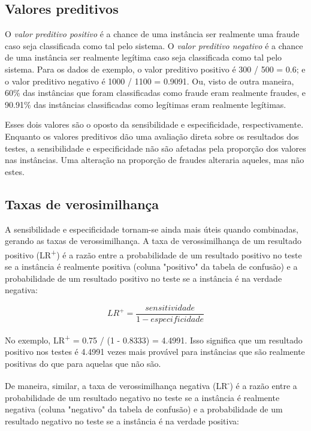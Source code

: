 \subsection{Valores preditivos}

O \emph{valor preditivo positivo} é a chance de uma instância ser realmente uma fraude caso seja classificada como tal pelo sistema. O \emph{valor preditivo negativo} é a chance de uma instância ser realmente legítima caso seja classificada como tal pelo sistema. Para os dados de exemplo, o valor preditivo positivo é 300 / 500 = 0.6; e o valor preditivo negativo é 1000 / 1100 = 0.9091. Ou, visto de outra maneira, 60\% das instâncias que foram classificadas como fraude eram realmente fraudes, e 90.91\% das instâncias classificadas como legítimas eram realmente legítimas.

Esses dois valores são o oposto da sensibilidade e especificidade, respectivamente. Enquanto os valores preditivos dão uma avaliação direta sobre os resultados dos testes, a sensibilidade e especificidade não são afetadas pela proporção dos valores nas instâncias. Uma alteração na proporção de fraudes alteraria aqueles, mas não estes.

\subsection{Taxas de verosimilhança}

A sensibilidade e especificidade tornam-se ainda mais úteis quando combinadas, gerando as taxas de verossimilhança. A taxa de verossimilhança de um resultado positivo (LR\textsuperscript{+}) é a razão entre a probabilidade de um resultado positivo no teste se a instância é realmente positiva (coluna "positivo" da tabela de confusão) e a probabilidade de um resultado positivo no teste se a instância é na verdade negativa:

\vspace{2mm}
\begin{equation}
    LR^{+}=\frac{sensitividade}{1 - especificidade}
\end{equation}
\vspace{2mm}

No exemplo, LR\textsuperscript{+} = 0.75 / (1 - 0.8333) = 4.4991. Isso significa que um resultado positivo nos testes é 4.4991 vezes mais provável para instâncias que são realmente positivas do que para aquelas que não são.

De maneira, similar, a taxa de verossimilhança negativa (LR\textsuperscript{-}) é a razão entre a probabilidade de um resultado negativo no teste se a instância é realmente negativa (coluna "negativo" da tabela de confusão) e a probabilidade de um resultado negativo no teste se a instância é na verdade positiva:

